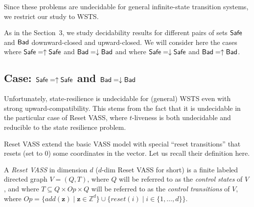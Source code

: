 


Since these problems are undecidable for general infinite-state transition systems, we restrict our study to WSTS.

As in the Section~3, we study decidability results for different pairs of sets $\textsf{Safe}$ and $\textsf{Bad}$ downward-closed and upward-closed. We will consider here the cases where 
$\textsf{Safe} = \uparrow \textsf{Safe}$ and $\textsf{Bad} = \downarrow \textsf{Bad}$ 
and where 
$\textsf{Safe} = \downarrow \textsf{Safe}$ and $\textsf{Bad} = \uparrow \textsf{Bad}$.


\subsection{Case: $\textsf{Safe} = \uparrow \textsf{Safe}$ and $\textsf{Bad} = \downarrow \textsf{Bad}$}



Unfortunately, state-resilience is undecidable for (general) WSTS even with strong upward-compatibility.
This stems from the fact that it is undecidable in the particular case of Reset VASS,
where  $t$-liveness is both undecidable and 
 reducible to the state resilience problem.


Reset VASS extend the basic VASS model with special “reset
transitions” that resets (set to $0$) some coordinates in the vector. Let us recall their definition here.\\




\begin{definition}
A {\em Reset VASS} in dimension $d$ ($d$-dim Reset VASS for short) is a finite 
labeled directed graph $V = (Q,T)$, where $Q$ will be referred to as the {\em control states} of $V$, and where 
$T \subseteq Q \times Op \times Q$
 will be referred to as the {\em control transitions} of $V$,
where $Op = \{ add(\textbf{z}) \mid \textbf{z} \in \mathds{Z}^d\} \cup 
		\{ reset(i) \mid i \in \{1,\ldots,d\} \}$.
\end{definition}

